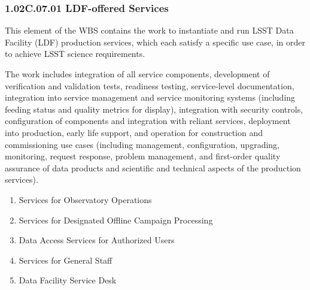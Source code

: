 \subsubsection{1.02C.07.01 LDF-offered Services}

This element of the WBS contains the work to instantiate and run LSST Data Facility (LDF) production services, which each satisfy a specific use case, in order to achieve LSST science requirements.

The work includes integration of all service components, development of verification and validation tests, readiness testing, service-level documentation, integration into service management and service monitoring systems (including feeding status and quality metrics for display), integration with security controls, configuration of components and integration with reliant services, deployment into production, early life support, and operation for construction and commissioning use cases (including management, configuration, upgrading, monitoring, request response, problem management, and first-order quality assurance of data products and scientific and technical aspects of the production services).

\begin{enumerate}

  \item{Services for Observatory Operations}
  \item{Services for Designated Offline Campaign Processing}
  \item{Data Access Services for Authorized Users}
  \item{Services for General Staff}
  \item{Data Facility Service Desk}

\end{enumerate}

